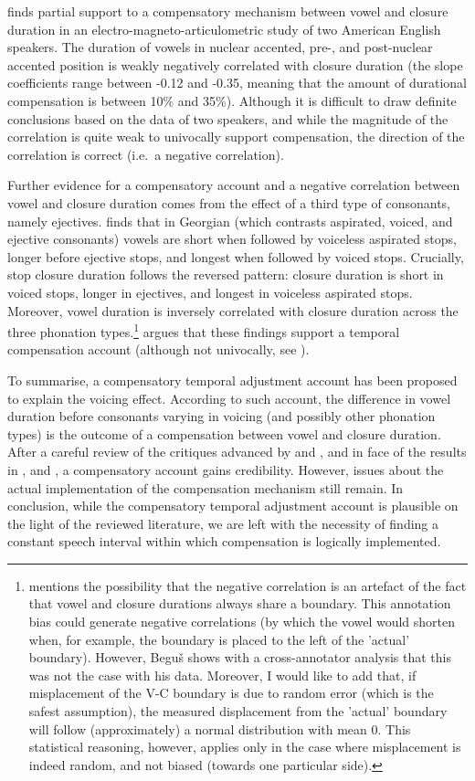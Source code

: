 \documentclass[12pt,]{article}
\let\rmarkdownfootnote\footnote%
\def\footnote{\protect\rmarkdownfootnote}
\begin{document}
\citet{de-jong1991} finds partial support to a compensatory mechanism
between vowel and closure duration in an electro-magneto-articulometric
study of two American English speakers. The duration of vowels in
nuclear accented, pre-, and post-nuclear accented position is weakly
negatively correlated with closure duration (the slope coefficients
range between -0.12 and -0.35, meaning that the amount of durational
compensation is between 10\% and 35\%). Although it is difficult to draw
definite conclusions based on the data of two speakers, and while the
magnitude of the correlation is quite weak to univocally support
compensation, the direction of the correlation is correct (i.e.~a
negative correlation).

Further evidence for a compensatory account and a negative correlation
between vowel and closure duration comes from the effect of a third type
of consonants, namely ejectives. \citet{begus2017} finds that in
Georgian (which contrasts aspirated, voiced, and ejective consonants)
vowels are short when followed by voiceless aspirated stops, longer
before ejective stops, and longest when followed by voiced stops.
Crucially, stop closure duration follows the reversed pattern: closure
duration is short in voiced stops, longer in ejectives, and longest in
voiceless aspirated stops. Moreover, vowel duration is inversely
correlated with closure duration across the three phonation
types.\footnote{\citet{begus2017} mentions the possibility that the negative correlation is an artefact of the fact that vowel and closure durations always share a boundary. This annotation bias could generate negative correlations (by which the vowel would shorten when, for example, the boundary is placed to the left of the 'actual' boundary). However, Beguš shows with a cross-annotator analysis that this was not the case with his data. Moreover, I would like to add that, if misplacement of the V-C boundary is due to random error (which is the safest assumption), the measured displacement from the 'actual' boundary will follow (approximately) a normal distribution with mean 0. This statistical reasoning, however, applies only in the case where misplacement is indeed random, and not biased (towards one particular side).}
\citet{begus2017} argues that these findings support a temporal
compensation account (although not univocally, see
\citealt[Section V]{begus2017}).

To summarise, a compensatory temporal adjustment account has been
proposed to explain the voicing effect. According to such account, the
difference in vowel duration before consonants varying in voicing (and
possibly other phonation types) is the outcome of a compensation between
vowel and closure duration. After a careful review of the critiques
advanced by \citet{chen1970} and \citet{maddieson1976}, and in face of
the results in \citet{slis1969}, \citet{de-jong1991} and
\citet{begus2017}, a compensatory account gains credibility. However,
issues about the actual implementation of the compensation mechanism
still remain. In conclusion, while the compensatory temporal adjustment
account is plausible on the light of the reviewed literature, we are
left with the necessity of finding a constant speech interval within
which compensation is logically implemented.
\end{document}
